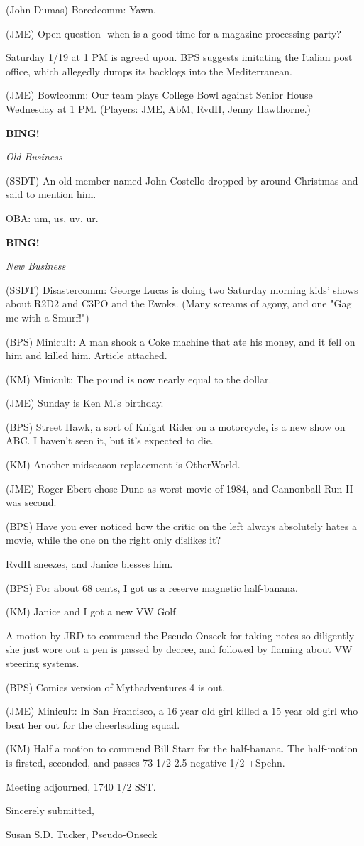 \documentclass[12pt]{article}
\newcommand{\bing}{{\bf BING!} }
\newcommand{\goto}[1]{\bing \vskip 12pt \centerline{{\em{#1}}}}
\begin{document}
(John Dumas) Boredcomm: Yawn.

(JME) Open question- when is a good time for a magazine processing party?

Saturday 1/19 at 1 PM is agreed upon. BPS suggests imitating the Italian post office, which allegedly dumps its backlogs into the Mediterranean.

(JME) Bowlcomm: Our team plays College Bowl against Senior House Wednesday at 1 PM. (Players: JME, AbM, RvdH, Jenny Hawthorne.)

\goto{Old Business}

(SSDT) An old member named John Costello dropped by around Christmas and said to mention him.

OBA: um, us, uv, ur.

\goto{New Business}

(SSDT) Disastercomm: George Lucas is doing two Saturday morning kids' shows about R2D2 and C3PO and the Ewoks. (Many screams of agony, and one "Gag me with a Smurf!")

(BPS) Minicult: A man shook a Coke machine that ate his money, and it fell on him and killed him. Article attached.

(KM) Minicult: The pound is now nearly equal to the dollar.

(JME) Sunday is Ken M.'s birthday.

(BPS) Street Hawk, a sort of Knight Rider on a motorcycle, is a new show on ABC. I haven't seen it, but it's expected to die.

(KM) Another midseason replacement is OtherWorld.

(JME) Roger Ebert chose Dune as worst movie of 1984, and Cannonball Run II was second.

(BPS) Have you ever noticed how the critic on the left always absolutely hates a movie, while the one on the right only dislikes it?

RvdH sneezes, and Janice blesses him.

(BPS) For about 68 cents, I got us a reserve magnetic half-banana.

(KM) Janice and I got a new VW Golf.

A motion by JRD to commend the Pseudo-Onseck for taking notes so diligently she just wore out a pen is passed by decree, and followed by flaming about VW steering systems.

(BPS) Comics version of Mythadventures 4 is out.

(JME) Minicult: In San Francisco, a 16 year old girl killed a 15 year old girl who beat her out for the cheerleading squad.

(KM) Half a motion to commend Bill Starr for the half-banana. The half-motion is firsted, seconded, and passes 73 1/2-2.5-negative 1/2 +Spehn.

\vspace{12pt}

\noindent
Meeting adjourned, 1740 1/2 SST.

\vspace{18pt}

\centerline{Sincerely submitted,}
\centerline{Susan S.D. Tucker, Pseudo-Onseck}
\end{document}
